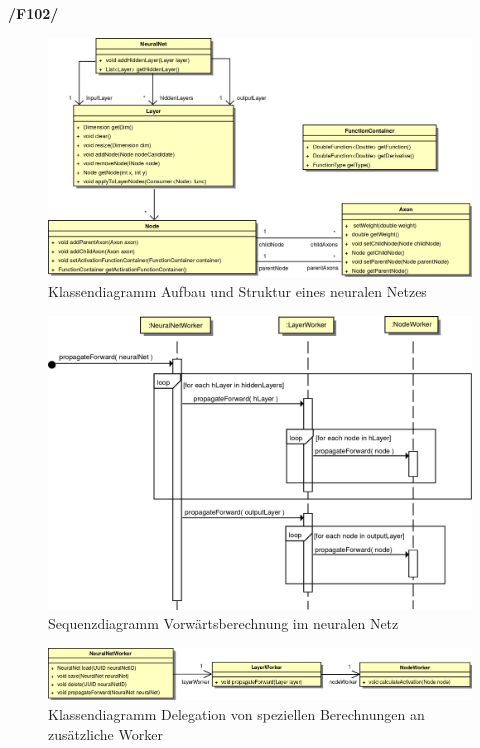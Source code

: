 \textbf{/F102/}
\vspace{-0.4cm}
\begin{figure}[H]
\begin{center}
\includegraphics[width=\textwidth]{Abbildungen/UML/uml_ronny/neuralNetKlassenDiagramm.png}
\caption{Klassendiagramm Aufbau und Struktur eines neuralen Netzes}
\label{fig_cdNet}
\end{center}
\end{figure}
\vspace{-0.5cm}
\begin{figure}[H]
\begin{center}
\includegraphics[width=13.5cm]{Abbildungen/UML/uml_ronny/forwardWorkerSequenzDiagramm.png}
\caption{Sequenzdiagramm Vorwärtsberechnung im neuralen Netz}
\label{fig_sdPropForw}
\end{center}
\end{figure}

\begin{figure}[H]
\begin{center}
\includegraphics[width=\textwidth]{Abbildungen/UML/uml_ronny/workerKlassenDiagramm.png}
\caption{Klassendiagramm Delegation von speziellen Berechnungen an zusätzliche Worker}
\label{fig_cdWorkerAndSubWorker}
\end{center}
\end{figure}

